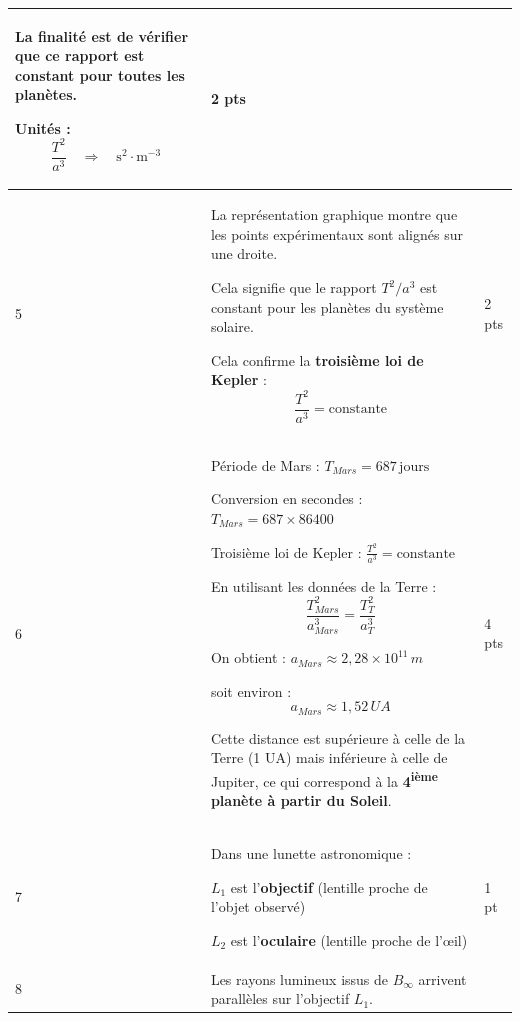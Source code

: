 \documentclass[a4paper,11pt,fleqn]{scrartcl}%
\begin{document}
\begin{center}
\begin{longtable}{||p{.1\linewidth}|p{.78\linewidth}|p{.07\linewidth}|}
La finalité est de vérifier que ce rapport est constant pour toutes les planètes.

Unités :$$
\frac{T^2}{a^3} \quad \Rightarrow \quad \text{s}^2\cdot \text{m}^{-3}$$

& 2 pts \\

\hline

5 &
La représentation graphique montre que les points expérimentaux sont alignés sur une droite.

Cela signifie que le rapport $T^2/a^3$ est constant pour les planètes du système solaire.

Cela confirme la \textbf{troisième loi de Kepler} :$$\frac{T^2}{a^3}= \text{constante}$$

& 2 pts \\

\hline

6 &
Période de Mars : $
T_{Mars}=687\,\text{jours}$

Conversion en secondes : 
$
T_{Mars}=687\times 86400
$

Troisième loi de Kepler : $\frac{T^2}{a^3}= \text{constante}$

En utilisant les données de la Terre : 
\[
\frac{T_{Mars}^2}{a_{Mars}^3}=\frac{T_T^2}{a_T^3}
\]

On obtient : $a_{Mars} \approx 2,28\times 10^{11}\,m$

soit environ :
\[
a_{Mars} \approx 1,52 \, UA
\]

Cette distance est supérieure à celle de la Terre (1 UA) mais inférieure à celle de Jupiter, ce qui correspond à la \textbf{4\textsuperscript{ième} planète à partir du Soleil}.

& 4 pts \\

\hline

7 &
Dans une lunette astronomique :

\begin{itemize*}
\item $L_1$ est l'\textbf{objectif} (lentille proche de l'objet observé)
\item $L_2$ est l'\textbf{oculaire} (lentille proche de l'œil)
\end{itemize*}

& 1 pt \\

\hline

8 &
Les rayons lumineux issus de $B_\infty$ arrivent parallèles sur l'objectif $L_1$.  


\end{longtable}
\end{center}
\end{document}
